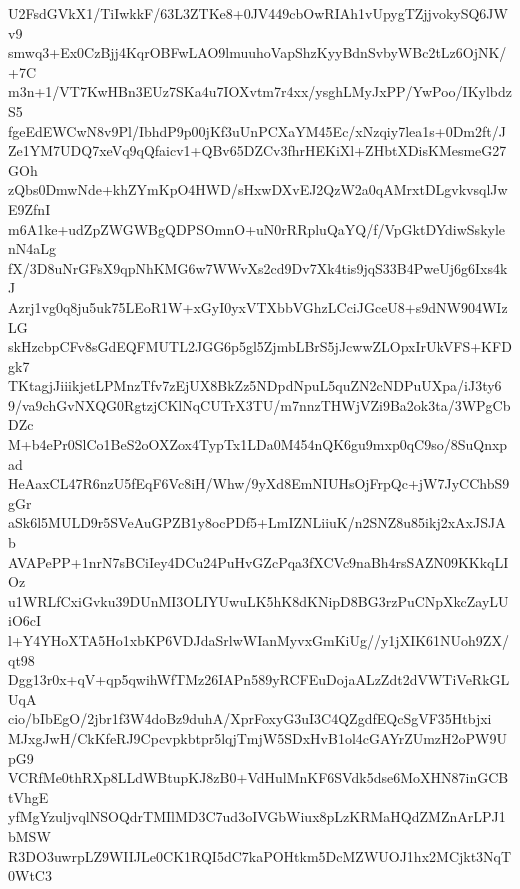U2FsdGVkX1/TiIwkkF/63L3ZTKe8+0JV449cbOwRIAh1vUpygTZjjvokySQ6JWv9
smwq3+Ex0CzBjj4KqrOBFwLAO9lmuuhoVapShzKyyBdnSvbyWBc2tLz6OjNK/+7C
m3n+1/VT7KwHBn3EUz7SKa4u7IOXvtm7r4xx/ysghLMyJxPP/YwPoo/IKylbdzS5
fgeEdEWCwN8v9Pl/IbhdP9p00jKf3uUnPCXaYM45Ec/xNzqiy7lea1s+0Dm2ft/J
Ze1YM7UDQ7xeVq9qQfaicv1+QBv65DZCv3fhrHEKiXl+ZHbtXDisKMesmeG27GOh
zQbs0DmwNde+khZYmKpO4HWD/sHxwDXvEJ2QzW2a0qAMrxtDLgvkvsqlJwE9ZfnI
m6A1ke+udZpZWGWBgQDPSOmnO+uN0rRRpluQaYQ/f/VpGktDYdiwSskylenN4aLg
fX/3D8uNrGFsX9qpNhKMG6w7WWvXs2cd9Dv7Xk4tis9jqS33B4PweUj6g6Ixs4kJ
Azrj1vg0q8ju5uk75LEoR1W+xGyI0yxVTXbbVGhzLCciJGceU8+s9dNW904WIzLG
skHzcbpCFv8sGdEQFMUTL2JGG6p5gl5ZjmbLBrS5jJcwwZLOpxIrUkVFS+KFDgk7
TKtagjJiiikjetLPMnzTfv7zEjUX8BkZz5NDpdNpuL5quZN2cNDPuUXpa/iJ3ty6
9/va9chGvNXQG0RgtzjCKlNqCUTrX3TU/m7nnzTHWjVZi9Ba2ok3ta/3WPgCbDZc
M+b4ePr0SlCo1BeS2oOXZox4TypTx1LDa0M454nQK6gu9mxp0qC9so/8SuQnxpad
HeAaxCL47R6nzU5fEqF6Vc8iH/Whw/9yXd8EmNIUHsOjFrpQc+jW7JyCChbS9gGr
aSk6l5MULD9r5SVeAuGPZB1y8ocPDf5+LmIZNLiiuK/n2SNZ8u85ikj2xAxJSJAb
AVAPePP+1nrN7sBCiIey4DCu24PuHvGZcPqa3fXCVc9naBh4rsSAZN09KKkqLIOz
u1WRLfCxiGvku39DUnMI3OLIYUwuLK5hK8dKNipD8BG3rzPuCNpXkcZayLUiO6cI
l+Y4YHoXTA5Ho1xbKP6VDJdaSrlwWIanMyvxGmKiUg//y1jXIK61NUoh9ZX/qt98
Dgg13r0x+qV+qp5qwihWfTMz26IAPn589yRCFEuDojaALzZdt2dVWTiVeRkGLUqA
cio/bIbEgO/2jbr1f3W4doBz9duhA/XprFoxyG3uI3C4QZgdfEQcSgVF35Htbjxi
MJxgJwH/CkKfeRJ9Cpcvpkbtpr5lqjTmjW5SDxHvB1ol4cGAYrZUmzH2oPW9UpG9
VCRfMe0thRXp8LLdWBtupKJ8zB0+VdHulMnKF6SVdk5dse6MoXHN87inGCBtVhgE
yfMgYzuljvqlNSOQdrTMIlMD3C7ud3oIVGbWiux8pLzKRMaHQdZMZnArLPJ1bMSW
R3DO3uwrpLZ9WIIJLe0CK1RQI5dC7kaPOHtkm5DcMZWUOJ1hx2MCjkt3NqT0WtC3
